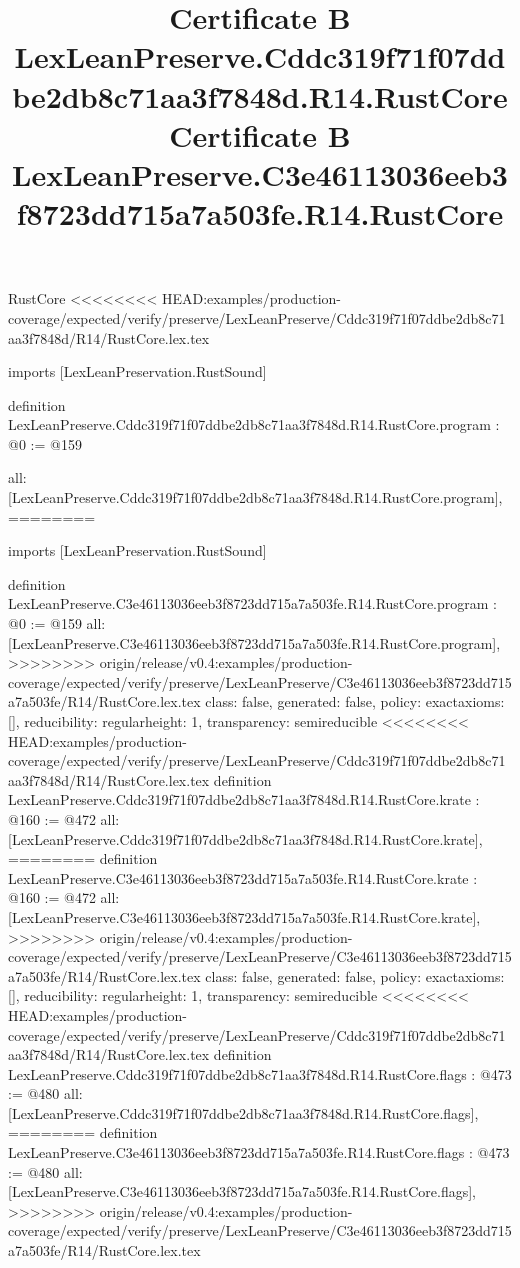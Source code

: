 \begin{lexlean}{RustCore}
<<<<<<<< HEAD:examples/production-coverage/expected/verify/preserve/LexLeanPreserve/Cddc319f71f07ddbe2db8c71aa3f7848d/R14/RustCore.lex.tex
\title{Certificate B LexLeanPreserve.Cddc319f71f07ddbe2db8c71aa3f7848d.R14.RustCore}
\begin{coremodule}
imports [LexLeanPreservation.RustSound]

definition LexLeanPreserve.Cddc319f71f07ddbe2db8c71aa3f7848d.R14.RustCore.program : @0 := @159 {
  all: [LexLeanPreserve.Cddc319f71f07ddbe2db8c71aa3f7848d.R14.RustCore.program],
========
\title{Certificate B LexLeanPreserve.C3e46113036eeb3f8723dd715a7a503fe.R14.RustCore}
\begin{coremodule}
imports [LexLeanPreservation.RustSound]

definition LexLeanPreserve.C3e46113036eeb3f8723dd715a7a503fe.R14.RustCore.program : @0 := @159 {
  all: [LexLeanPreserve.C3e46113036eeb3f8723dd715a7a503fe.R14.RustCore.program],
>>>>>>>> origin/release/v0.4:examples/production-coverage/expected/verify/preserve/LexLeanPreserve/C3e46113036eeb3f8723dd715a7a503fe/R14/RustCore.lex.tex
  class: false,
  generated: false,
  policy: exact{axioms: []},
  reducibility: regular{height: 1},
  transparency: semireducible
}
<<<<<<<< HEAD:examples/production-coverage/expected/verify/preserve/LexLeanPreserve/Cddc319f71f07ddbe2db8c71aa3f7848d/R14/RustCore.lex.tex
definition LexLeanPreserve.Cddc319f71f07ddbe2db8c71aa3f7848d.R14.RustCore.krate : @160 := @472 {
  all: [LexLeanPreserve.Cddc319f71f07ddbe2db8c71aa3f7848d.R14.RustCore.krate],
========
definition LexLeanPreserve.C3e46113036eeb3f8723dd715a7a503fe.R14.RustCore.krate : @160 := @472 {
  all: [LexLeanPreserve.C3e46113036eeb3f8723dd715a7a503fe.R14.RustCore.krate],
>>>>>>>> origin/release/v0.4:examples/production-coverage/expected/verify/preserve/LexLeanPreserve/C3e46113036eeb3f8723dd715a7a503fe/R14/RustCore.lex.tex
  class: false,
  generated: false,
  policy: exact{axioms: []},
  reducibility: regular{height: 1},
  transparency: semireducible
}
<<<<<<<< HEAD:examples/production-coverage/expected/verify/preserve/LexLeanPreserve/Cddc319f71f07ddbe2db8c71aa3f7848d/R14/RustCore.lex.tex
definition LexLeanPreserve.Cddc319f71f07ddbe2db8c71aa3f7848d.R14.RustCore.flags : @473 := @480 {
  all: [LexLeanPreserve.Cddc319f71f07ddbe2db8c71aa3f7848d.R14.RustCore.flags],
========
definition LexLeanPreserve.C3e46113036eeb3f8723dd715a7a503fe.R14.RustCore.flags : @473 := @480 {
  all: [LexLeanPreserve.C3e46113036eeb3f8723dd715a7a503fe.R14.RustCore.flags],
>>>>>>>> origin/release/v0.4:examples/production-coverage/expected/verify/preserve/LexLeanPreserve/C3e46113036eeb3f8723dd715a7a503fe/R14/RustCore.lex.tex
}}}
\end{coremodule}}
\end{coremodule}
\end{lexlean}

